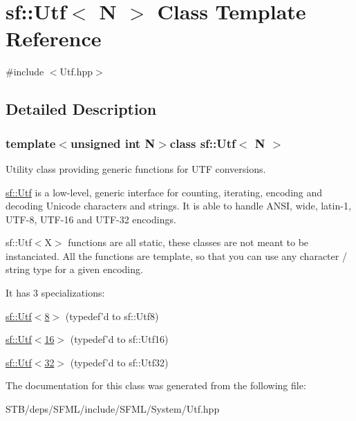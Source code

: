 \hypertarget{singletonsf_1_1_utf}{\section{sf\+:\+:Utf$<$ N $>$ Class Template Reference}
\label{singletonsf_1_1_utf}
}


{\ttfamily \#include $<$Utf.\+hpp$>$}



\subsection{Detailed Description}
\subsubsection*{template$<$unsigned int N$>$class sf\+::\+Utf$<$ N $>$}

Utility class providing generic functions for U\+T\+F conversions.

\hyperlink{singletonsf_1_1_utf}{sf\+::\+Utf} is a low-\/level, generic interface for counting, iterating, encoding and decoding Unicode characters and strings. It is able to handle A\+N\+S\+I, wide, latin-\/1, U\+T\+F-\/8, U\+T\+F-\/16 and U\+T\+F-\/32 encodings.

sf\+::\+Utf$<$\+X$>$ functions are all static, these classes are not meant to be instanciated. All the functions are template, so that you can use any character / string type for a given encoding.

It has 3 specializations\+: \begin{DoxyItemize}
\item \hyperlink{classsf_1_1_utf_3_018_01_4}{sf\+::\+Utf$<$8$>$} (typedef'd to sf\+::\+Utf8) \item \hyperlink{classsf_1_1_utf_3_0116_01_4}{sf\+::\+Utf$<$16$>$} (typedef'd to sf\+::\+Utf16) \item \hyperlink{classsf_1_1_utf_3_0132_01_4}{sf\+::\+Utf$<$32$>$} (typedef'd to sf\+::\+Utf32) \end{DoxyItemize}


The documentation for this class was generated from the following file\+:\begin{DoxyCompactItemize}
\item 
S\+T\+B/deps/\+S\+F\+M\+L/include/\+S\+F\+M\+L/\+System/Utf.\+hpp\end{DoxyCompactItemize}
